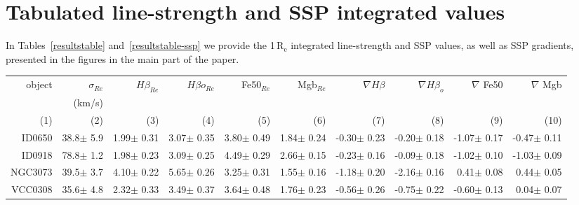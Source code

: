 \documentclass[useAMS,usenatbib]{mn2e}
\newcommand{\re}{$\mathrm{R_e}$}
\newcommand{\sig}{$\sigma$}
\newcommand{\mgb}{Mg\,$b$}
\begin{document}
\section{Tabulated line-strength and SSP integrated values}
\label{app-a}

In Tables~\ref{resultstable} and~\ref{resultstable-ssp} we provide the 1\,{\re} integrated line-strength and SSP values, as well as SSP gradients, presented in the figures in the main part of the paper.

\begin{table*}
\caption{(1) Galaxy names as in Table 1, (2)-(6) integrated within 1\,{\re} stellar velocity dispersion {\sig} and $H\beta$, $H\beta_o$, Fe5015, and {\mgb} index values, (7)-(10) $H\beta$, $H\beta_o$, Fe5015, and {\mgb} index gradients.} 
\begin{threeparttable}
\centering
\begin{tabular}{|r|r|r|r|r|r|r|r|r|r|}
\hline
object    &$\sigma_{Re}$&$H\beta_{Re}$ &$H\beta o_{Re}$ &Fe50$_{Re}$ &Mgb$_{Re}$   &$\nabla H\beta$ &$\nabla H\beta_o$ &$\nabla$ Fe50 &$\nabla$ Mgb  \\
          &    (km/s)     &              &                &              &           &                &                &                &            \\
   (1)    &    (2)        &    (3)       &    (4)         &    (5)       &   (6)     &    (7)         &    (8)         &    (9)        &   (10)     \\
\hline
ID0650&        38.8$\pm$       5.9&       1.99$\pm$      0.31&       3.07$\pm$      0.35&       3.80$\pm$      0.49&       1.84$\pm$      0.24&     -0.30$\pm$      0.23&     -0.20$\pm$      0.18&     -1.07$\pm$      0.17&     -0.47$\pm$     0.11\\
ID0918&        78.8$\pm$       1.2&       1.98$\pm$      0.23&       3.09$\pm$      0.25&       4.49$\pm$      0.29&       2.66$\pm$      0.15&     -0.23$\pm$      0.16&     -0.09$\pm$      0.18&     -1.02$\pm$      0.10&     -1.03$\pm$     0.09\\
NGC3073&       39.5$\pm$       3.7&       4.10$\pm$      0.22&       5.65$\pm$      0.26&       3.25$\pm$      0.31&       1.55$\pm$      0.16&     -1.18$\pm$      0.20&     -2.16$\pm$      0.16&      0.41$\pm$      0.08&      0.44$\pm$     0.05\\
VCC0308&       35.6$\pm$       4.8&       2.32$\pm$      0.33&       3.49$\pm$      0.37&       3.64$\pm$      0.48&       1.76$\pm$      0.23&     -0.56$\pm$      0.26&     -0.75$\pm$      0.22&     -0.60$\pm$      0.13&      0.04$\pm$     0.07\\

\end{tabular}
\end{threeparttable}
\end{table*}
\end{document}

